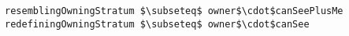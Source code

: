 \lstset{frame=tb, aboveskip=12pt, belowskip=-3pt, breaklines=true, basicstyle=\small\ttfamily, tabsize=2, mathescape=true}
\begin{lstlisting}[caption={facts.als, lines 85-86}, label=alloy:ELEMENT_VISIBIILITY_2, captionpos=b]
resemblingOwningStratum $\subseteq$ owner$\cdot$canSeePlusMe
redefiningOwningStratum $\subseteq$ owner$\cdot$canSee
\end{lstlisting}